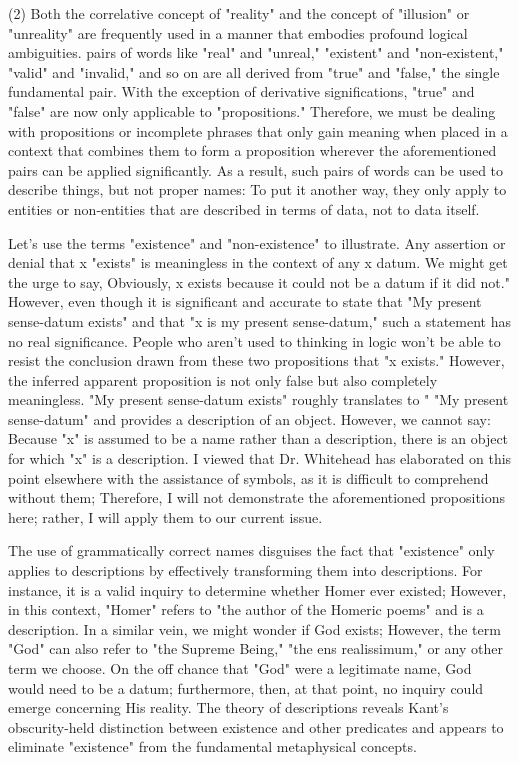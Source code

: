 \documentclass[a4paper,12pt]{book}[2004/02/16]
\theoremstyle{ilemma}
\theoremstyle{itheorem}
\theoremstyle{iother}
\theoremstyle{icorollary}
\theoremstyle{numcorollary}
\theoremstyle{idefinition}
\begin{document}
(2) Both the correlative concept of "reality" and the concept of "illusion" or "unreality" are frequently used in a manner that embodies profound logical ambiguities. pairs of words like "real" and "unreal," "existent" and "non-existent," "valid" and "invalid," and so on are all derived from "true" and "false," the single fundamental pair. With the exception of derivative significations, "true" and "false" are now only applicable to "propositions." Therefore, we must be dealing with propositions or incomplete phrases that only gain meaning when placed in a context that combines them to form a proposition wherever the aforementioned pairs can be applied significantly. As a result, such pairs of words can be used to describe things, but not proper names: To put it another way, they only apply to entities or non-entities that are described in terms of data, not to data itself.

Let's use the terms "existence" and "non-existence" to illustrate. Any assertion or denial that x "exists" is meaningless in the context of any x datum. We might get the urge to say, Obviously, x exists because it could not be a datum if it did not." However, even though it is significant and accurate to state that "My present sense-datum exists" and that "x is my present sense-datum," such a statement has no real significance. People who aren't used to thinking in logic won't be able to resist the conclusion drawn from these two propositions that "x exists." However, the inferred apparent proposition is not only false but also completely meaningless. "My present sense-datum exists" roughly translates to " "My present sense-datum" and provides a description of an object. However, we cannot say: Because "x" is assumed to be a name rather than a description, there is an object for which "x" is a description. I viewed that Dr. Whitehead has elaborated on this point elsewhere with the assistance of symbols, as it is difficult to comprehend without them; Therefore, I will not demonstrate the aforementioned propositions here; rather, I will apply them to our current issue.

The use of grammatically correct names disguises the fact that "existence" only applies to descriptions by effectively transforming them into descriptions. For instance, it is a valid inquiry to determine whether Homer ever existed; However, in this context, "Homer" refers to "the author of the Homeric poems" and is a description. In a similar vein, we might wonder if God exists; However, the term "God" can also refer to "the Supreme Being," "the ens realissimum," or any other term we choose. On the off chance that "God" were a legitimate name, God would need to be a datum; furthermore,
then, at that point, no inquiry could emerge concerning His reality. The theory of descriptions reveals Kant's obscurity-held distinction between existence and other predicates and appears to eliminate "existence" from the fundamental metaphysical concepts.
\end{document}

